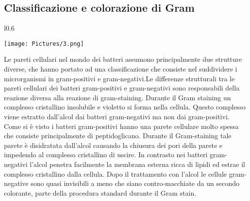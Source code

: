 \subsection{Classificazione e colorazione di Gram}
\begin{wrapfigure}{l}{0.6\textwidth}
  \begin{center}
    \texttt{[image: Pictures/3.png]}
  \end{center}
\end{wrapfigure}
Le pareti cellulari nel mondo dei batteri assumono principalmente due strutture diverse, che hanno portato ad una classificazione che consiste nel 
suddividere i microrganismi in gram-positivi e gram-negativi.Le differenze strutturali tra le pareti cellulari dei batteri gram-positivi e gram-negativi sono responsabili della reazione diversa alla 
reazione di gram-staining. Durante il  Gram staining un complesso cristallino insolubile e violetto si forma nella cellula. Questo complesso viene estratto dall'alcol dai batteri gram-negativi ma non dai gram-positivi.
Come si \`e visto i batteri gram-positivi hanno una parete cellulare molto spessa che consiste principalmente di peptidoglicano. Durante il Gram-staining tale parete \`e disidratata dall'alcol causando la chiusura dei pori della parete e 
impedendo al complesso cristallino di uscire. In contrasto nei batteri gram-negativi l'alcol penetra facilmente la membrana esterna ricca di lipidi ed estrae il complesso cristallino dalla cellula. Dopo il trattamento con l'alcol le 
cellule gram-negative sono quasi invisibili a meno che siano contro-macchiate da un secondo colorante, parte della procedura standard durante il Gram stain.
